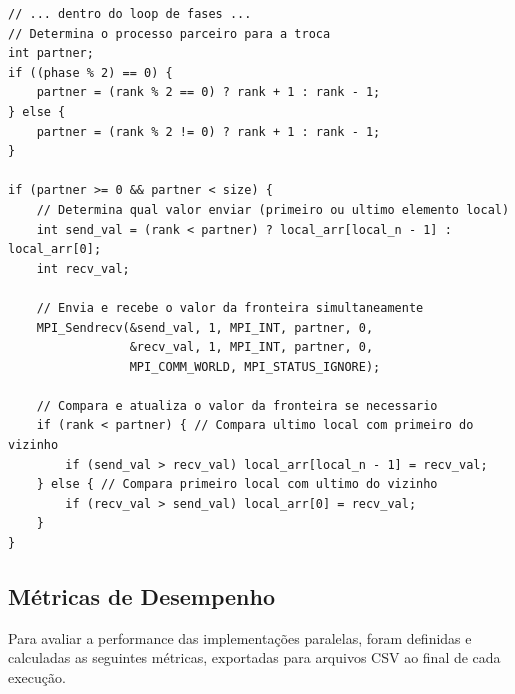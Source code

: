 \documentclass[12pt, a4paper]{article}
\begin{document}
\begin{lstlisting}[caption={Lógica de comunicação de fronteira na implementação MPI.}, label=lst:mpi]
// ... dentro do loop de fases ...
// Determina o processo parceiro para a troca
int partner;
if ((phase % 2) == 0) {
    partner = (rank % 2 == 0) ? rank + 1 : rank - 1;
} else {
    partner = (rank % 2 != 0) ? rank + 1 : rank - 1;
}

if (partner >= 0 && partner < size) {
    // Determina qual valor enviar (primeiro ou ultimo elemento local)
    int send_val = (rank < partner) ? local_arr[local_n - 1] : local_arr[0];
    int recv_val;
    
    // Envia e recebe o valor da fronteira simultaneamente
    MPI_Sendrecv(&send_val, 1, MPI_INT, partner, 0,
                 &recv_val, 1, MPI_INT, partner, 0,
                 MPI_COMM_WORLD, MPI_STATUS_IGNORE);

    // Compara e atualiza o valor da fronteira se necessario
    if (rank < partner) { // Compara ultimo local com primeiro do vizinho
        if (send_val > recv_val) local_arr[local_n - 1] = recv_val;
    } else { // Compara primeiro local com ultimo do vizinho
        if (recv_val > send_val) local_arr[0] = recv_val;
    }
}
\end{lstlisting}

\subsection{Métricas de Desempenho}
Para avaliar a performance das implementações paralelas, foram definidas e calculadas as seguintes métricas, exportadas para arquivos CSV ao final de cada execução.
\end{document}
